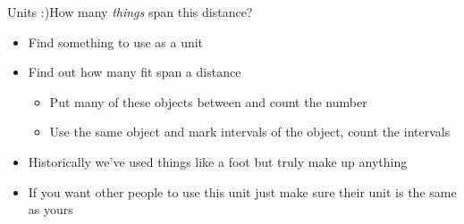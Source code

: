 \documentclass[12pt]{beamer}
\begin{document}
        \begin{frame}{Units :)}{How many \textit{things} span this distance?}
            \begin{itemize}
                \item<2-> Find something to use as a unit
                \item<3-> Find out how many fit span a distance
                \begin{itemize}
                    \item Put many of these objects between and count the number
                    \item Use the same object and mark intervals of the object, count the intervals
                \end{itemize}
                \item<4-> Historically we've used things like a foot but truly make up anything
                \item<5-> If you want other people to use this unit just make sure their unit is the same as yours
            \end{itemize}
        \end{frame}
\end{document}
